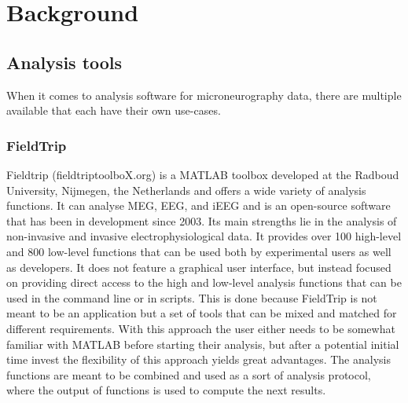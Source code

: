 \chapter{Background}


\section{Analysis tools}
When it comes to analysis software for microneurography data,  there are multiple available that each have their own use-cases.

\subsection{FieldTrip}
Fieldtrip (fieldtriptoolboX.org) is a MATLAB toolbox developed at the Radboud University,  Nijmegen,  the Netherlands and offers a wide variety of analysis functions.  It can analyse MEG, EEG, and iEEG and is an open-source software that has been in development since 2003. Its main strengths lie in the analysis of non-invasive and invasive electrophysiological data. It provides over 100 high-level and 800 low-level functions that can be used both by experimental users as well as developers. It does not feature a graphical user interface, but instead focused on providing direct access to the high and low-level analysis functions that can be used in the command line or in scripts.  This is done because FieldTrip is not meant to be an application but a set of tools that can be mixed and matched for different requirements.
With this approach the user either needs to be somewhat familiar with MATLAB before starting their analysis, but after a potential initial time invest the flexibility of this approach yields great advantages.
The analysis functions are meant to be combined and used as a sort of analysis protocol, where the output of functions is used to compute the next results. 

